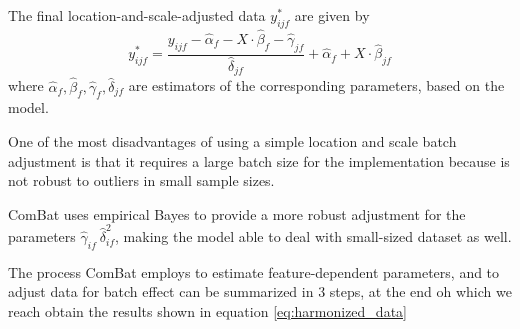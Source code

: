 \documentclass[11pt]{report}
\begin{document}
The final location-and-scale-adjusted data $y^{\ast}_{ijf}$ are given by
\begin{equation}\label{eq:harmonized_data}
y^{\ast}_{ijf} = \frac{y_{ijf} - \hat \alpha_f - X\cdot \hat \beta_f - \hat \gamma_{jf}}{\hat \delta_{jf}} + \hat \alpha_f + X \cdot \hat \beta_{jf}
\end{equation}
where $\hat \alpha_f , \hat \beta_f , \hat \gamma_f ,  \hat \delta_{jf}$ are estimators of the corresponding parameters, based on the model.

One of the most disadvantages of using a simple location and scale batch adjustment is that it requires a large batch size for the implementation because is not robust to outliers in small sample sizes.

ComBat uses empirical Bayes to provide a more robust adjustment for the parameters $\hat \gamma_{if} \ \hat \delta^2_{if}$, making the model able to deal with small-sized dataset as well.


The process ComBat employs to estimate feature-dependent parameters, and to adjust data for batch effect can be summarized in 3 steps, at the end oh which we reach obtain the results shown in equation \ref{eq:harmonized_data}
\end{document}
